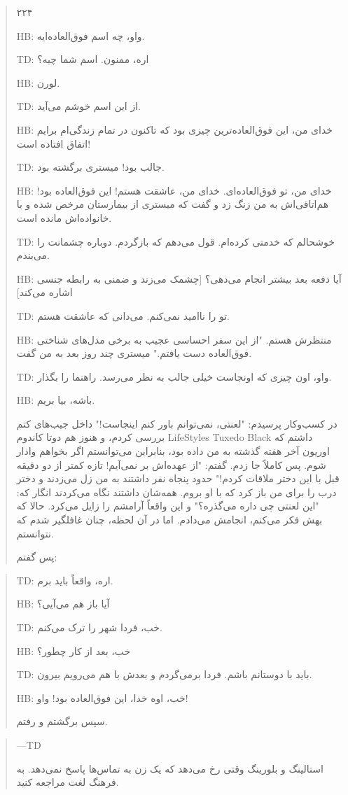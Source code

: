 \begin{quote}
۲۲۴

\noindent HB: واو، چه اسم فوق‌العاده‌ایه.
    
\noindent TD: اره، ممنون. اسم شما چیه؟
    
\noindent HB: لورن.
    
\noindent TD: از این اسم خوشم می‌آید.
    
\noindent HB: خدای من، این فوق‌العاده‌ترین چیزی بود که تاکنون در تمام زندگی‌ام برایم اتفاق افتاده است!
    
\noindent TD: جالب بود! میستری برگشته بود.
    
\noindent HB: خدای من، تو فوق‌العاده‌ای. خدای من، عاشقت هستم! این فوق‌العاده بود! هم‌اتاقی‌اش به من زنگ زد و گفت که میستری از بیمارستان مرخص شده و با خانواده‌اش مانده است.
    
\noindent TD: خوشحالم که خدمتی کرده‌ام. قول می‌دهم که بازگردم. دوباره چشمانت را می‌بندم.
    
\noindent HB: آیا دفعه بعد بیشتر انجام می‌دهی؟ [چشمک می‌زند و ضمنی به رابطه جنسی اشاره می‌کند]
    
\noindent TD: تو را ناامید نمی‌کنم. می‌دانی که عاشقت هستم.
    
\noindent HB: منتظرش هستم. "از این سفر احساسی عجیب به برخی مدل‌های شناختی فوق‌العاده دست یافتم." میستری چند روز بعد به من گفت.
    
\noindent TD: واو، اون چیزی که اونجاست خیلی جالب به نظر می‌رسد. راهنما را بگذار.
    
\noindent HB: باشه، بیا بریم.

در کسب‌وکار پرسیدم: "لعنتی، نمی‌توانم باور کنم اینجاست!" داخل جیب‌های کتم بررسی کردم، و هنوز هم دوتا کاندوم LifeStyles Tuxedo Black داشتم که اوریون آخر هفته گذشته به من داده بود، بنابراین می‌توانستم اگر بخواهم وادار شوم. پس کاملاً جا زدم. گفتم: "از عهده‌اش بر نمی‌آیم! تازه کمتر از دو دقیقه قبل با این دختر ملاقات کردم!" حدود پنجاه نفر داشتند به من زل می‌زدند و دختر درب را برای من باز کرد که با او بروم. همه‌شان داشتند نگاه می‌کردند انگار که: "این لعنتی چی داره می‌گذره؟" و این واقعاً آرامشم را زایل می‌کرد. حالا که بهش فکر می‌کنم، انجامش می‌دادم. اما در آن لحظه، چنان غافلگیر شدم که نتوانستم.

پس گفتم:
\end{quote}

\begin{quote}
\noindent TD: اره، واقعاً باید برم.

\noindent HB: آیا باز هم می‌آیی؟

\noindent TD: خب، فردا شهر را ترک می‌کنم.

\noindent HB: خب، بعد از کار چطور؟

\noindent TD: باید با دوستانم باشم. فردا برمی‌گردم و بعدش با هم می‌رویم بیرون.

\noindent HB: خب، اوه خدا، این فوق‌العاده بود! واو!

سپس برگشتم و رفتم.
\end{quote}

\begin{quote}
\noindent —TD

استالینگ و بلورینگ وقتی رخ می‌دهد که یک زن به تماس‌ها پاسخ نمی‌دهد. به فرهنگ لغت مراجعه کنید.
\end{quote}